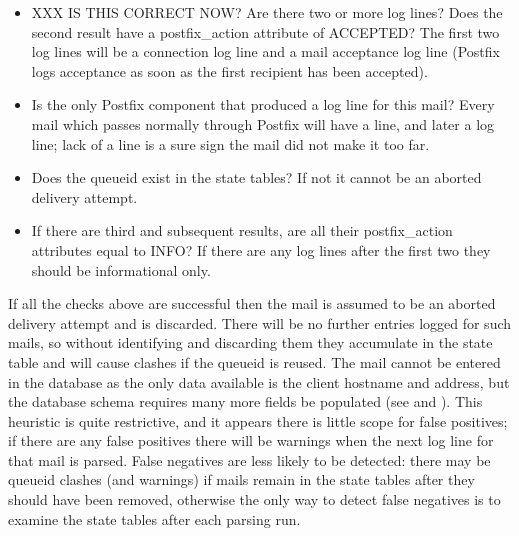 \begin{itemize}

    \item XXX IS THIS CORRECT NOW\@?\newline{}  Are there two or more
         log lines?  Does the second result have a
        postfix\_action attribute of ACCEPTED\@?  The first two
         log lines will be a connection log line and a mail
        acceptance log line (Postfix logs acceptance as soon as the first
        recipient has been accepted).

    \item Is  the only Postfix component that produced a log
        line for this mail?  Every mail which passes normally through
        Postfix will have a  line, and later a
         log line; lack of a  line is a sure
        sign the mail did not make it too far.  

    \item Does the queueid exist in the state tables?  If not it cannot be
        an aborted delivery attempt.

    \item If there are third and subsequent results, are all their
        postfix\_action attributes equal to INFO\@?  If there are any log
        lines after the first two they should be informational only.

\end{itemize}

If all the checks above are successful then the mail is assumed to be an
aborted delivery attempt and is discarded.  There will be no further
entries logged for such mails, so without identifying and discarding them
they accumulate in the state table and will cause clashes if the queueid is
reused.  The mail cannot be entered in the database as the only data
available is the client hostname and  address, but the database
schema requires many more fields be populated (see  and ).  This heuristic is quite
restrictive, and it appears there is little scope for false positives; if
there are any false positives there will be warnings when the next log line
for that mail is parsed.  False negatives are less likely to be detected:
there may be queueid clashes (and warnings) if mails remain in the state
tables after they should have been removed, otherwise the only way to
detect false negatives is to examine the state tables after each parsing
run.

